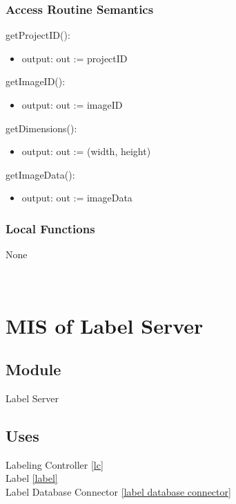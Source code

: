 \documentclass[12pt, titlepage]{article}
\begin{document}
\subsubsection{Access Routine Semantics}

\noindent getProjectID():
\begin{itemize}
\item output: out := projectID
\end{itemize}

\noindent getImageID():
\begin{itemize}
\item output: out := imageID
\end{itemize}

\noindent getDimensions():
\begin{itemize}
\item output: out := (width, height)
\end{itemize}

\noindent getImageData():
\begin{itemize}
\item output: out := imageData
\end{itemize}

\subsubsection{Local Functions}
None



\newpage
  ~\newpage
  
  \section{MIS of Label Server}\label{LabelServer}
  
  
  
  \subsection{Module}
  
  Label Server
  
  \subsection{Uses}
  
  Labeling Controller \ref{lc}\\
  Label \ref{label}\\ 
  Label Database Connector \ref{label database connector}
  
\end{document}
